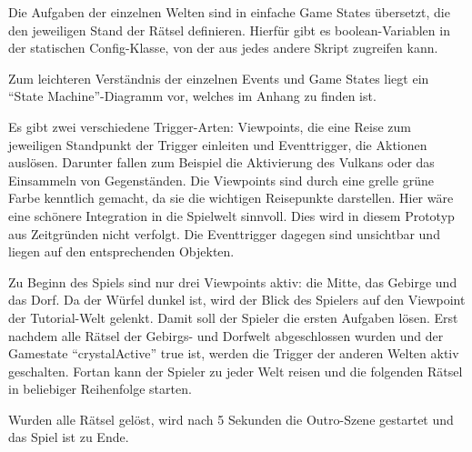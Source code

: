 
Die Aufgaben der einzelnen Welten sind in einfache Game States übersetzt, die den jeweiligen Stand der Rätsel definieren. Hierfür gibt es boolean-Variablen in der statischen Config-Klasse, von der aus jedes andere Skript zugreifen kann.

Zum leichteren Verständnis der einzelnen Events und Game States liegt ein \enquote{State Machine}-Diagramm vor, welches im Anhang zu finden ist.

Es gibt zwei verschiedene Trigger-Arten: Viewpoints, die eine Reise zum jeweiligen Standpunkt der Trigger einleiten und Eventtrigger, die Aktionen auslösen. Darunter fallen zum Beispiel die Aktivierung des Vulkans oder das Einsammeln von Gegenständen.
Die Viewpoints sind durch eine grelle grüne Farbe kenntlich gemacht, da sie die wichtigen Reisepunkte darstellen. Hier wäre eine schönere Integration in die Spielwelt sinnvoll. Dies wird in diesem Prototyp aus Zeitgründen nicht verfolgt. Die Eventtrigger dagegen sind unsichtbar und liegen auf den entsprechenden Objekten.

Zu Beginn des Spiels sind nur drei Viewpoints aktiv: die Mitte, das Gebirge und das Dorf. Da der Würfel dunkel ist, wird der Blick des Spielers auf den Viewpoint der Tutorial-Welt gelenkt. Damit soll der Spieler die ersten Aufgaben lösen. Erst nachdem alle Rätsel der Gebirgs- und Dorfwelt abgeschlossen wurden und der Gamestate \enquote{crystalActive} true ist, werden die Trigger der anderen Welten aktiv geschalten. Fortan kann der Spieler zu jeder Welt reisen und die folgenden Rätsel in beliebiger Reihenfolge starten.

Wurden alle Rätsel gelöst, wird nach 5 Sekunden die Outro-Szene gestartet und das Spiel ist zu Ende.